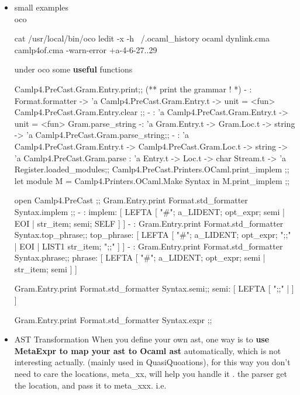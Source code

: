 \begin{itemize}
 \item small examples \\
   {\color{red} oco}
   

\begin{bluecode}
cat /usr/local/bin/oco
ledit -x -h ~/.ocaml_history ocaml dynlink.cma camlp4of.cma -warn-error +a-4-6-27..29
\end{bluecode}


   under oco some \textbf{useful} functions


\begin{bluecode}
Camlp4.PreCast.Gram.Entry.print;; (** print the grammar ! *)
- : Format.formatter -> 'a Camlp4.PreCast.Gram.Entry.t -> unit = <fun>
Camlp4.PreCast.Gram.Entry.clear ;;
- : 'a Camlp4.PreCast.Gram.Entry.t -> unit = <fun>
Gram.parse_string
-: 'a Gram.Entry.t -> Gram.Loc.t -> string -> 'a 
Camlp4.PreCast.Gram.parse_string;;
- : 'a Camlp4.PreCast.Gram.Entry.t ->
    Camlp4.PreCast.Gram.Loc.t -> string -> 'a
Camlp4.PreCast.Gram.parse : 'a Entry.t -> Loc.t -> char Stream.t -> 'a
Register.loaded_modules;;
Camlp4.PreCast.Printers.OCaml.print_implem ;;
let module M = Camlp4.Printers.OCaml.Make Syntax in M.print_implem ;;
\end{bluecode}


   

\begin{bluecode}
open Camlp4.PreCast ;;
Gram.Entry.print Format.std_formatter Syntax.implem ;;
- : 
implem: [ LEFTA
  [ "#"; a_LIDENT; opt_expr; semi
  | EOI
  | str_item; semi; SELF ] ]
- : 
Gram.Entry.print Format.std_formatter Syntax.top_phrase;;
top_phrase: [ LEFTA
  [ "#"; a_LIDENT; opt_expr; ";;"
  | EOI
  | LIST1 str_item; ";;" ] ]
- : 
Gram.Entry.print Format.std_formatter Syntax.phrase;;
phrase: [ LEFTA
  [ "#"; a_LIDENT; opt_expr; semi
  | str_item; semi ] ]

Gram.Entry.print Format.std_formatter Syntax.semi;;
semi: [ LEFTA
  [ ";;"
  |  ] ]

Gram.Entry.print Format.std_formatter Syntax.expr ;; 
\end{bluecode}



 \item AST Transformation 
  When you define your own ast, one way is to {\bf use MetaExpr to map your ast to Ocaml ast}
  automatically, which is not interesting actually. (mainly used in QuasiQuoations), for this way you don't need to care the locations, meta\_xx, will help you handle it . the parser
  get the location, and pass it to meta\_xxx. i.e. 



\end{itemize}
